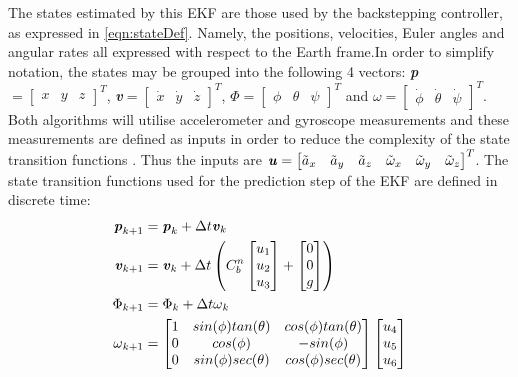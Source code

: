 The states estimated by this EKF are those used by the backstepping controller, as expressed in \eqref{eqn:stateDef}. Namely, the positions, velocities, Euler angles and angular rates all expressed with respect to the Earth frame.In order to simplify notation, the states may be grouped into the following 4 vectors: \textbf{\textit{p}}$=\begin{bmatrix}x& y& z\end{bmatrix}^{T}$, \textbf{\textit{v}}$=\begin{bmatrix}\dot{x}& \dot{y}& \dot{z}\end{bmatrix}^{T}$, \textbf{\textit{$\Phi$}}$=\begin{bmatrix}\phi& \theta& \psi\end{bmatrix}^{T}$ and \textbf{\textit{$\omega$}}$=\begin{bmatrix}\dot{\phi}& \dot{\theta}& \dot{\psi}\end{bmatrix}^{T}$. Both algorithms will utilise accelerometer and gyroscope measurements and these measurements are defined as inputs in order to reduce the complexity of the state transition functions \cite{Driessen2018}. Thus the inputs are $\textbf{\textit{u}}=
\begin{bmatrix}
\tilde{a}_{x}&\tilde{a}_{y}&\tilde{a}_{z}&\tilde{\omega}_{x}&\tilde{\omega}_{y}&\tilde{\omega}_{z}
\end{bmatrix}^{T}
$. The state transition functions used for the prediction step of the EKF are defined in discrete time:
\begin{equation}\label{eqn:OFS_EKFStateTrans}
\begin{split}
\textbf{\textit{p}}_{k+1}&=\textbf{\textit{p}}_{k}+\Delta t\textbf{\textit{v}}_{k} \\
\textbf{\textit{v}}_{k+1}&=\textbf{\textit{v}}_{k}+\Delta t\left( C^{n}_{b}
\begin{bmatrix}
u_{1}\\
u_{2}\\
u_{3}
\end{bmatrix}
+
\begin{bmatrix}
0\\
0\\
g
\end{bmatrix}
\right)\\
\textbf{\textit{$\Phi$}}_{k+1}&=\textbf{\textit{$\Phi$}}_{k}+\Delta t\textbf{\textit{$\omega$}}_{k}\\
\textbf{\textit{$\omega$}}_{k+1}&=
\begin{bmatrix}
1& sin(\phi)tan(\theta)& cos(\phi)tan(\theta)\\
0 &cos(\phi) &-sin(\phi)\\
0 &sin(\phi)sec(\theta) &cos(\phi)sec(\theta)
\end{bmatrix}
\begin{bmatrix}
u_{4}\\
u_{5}\\
u_{6}
\end{bmatrix}
\end{split}
\end{equation}
 

